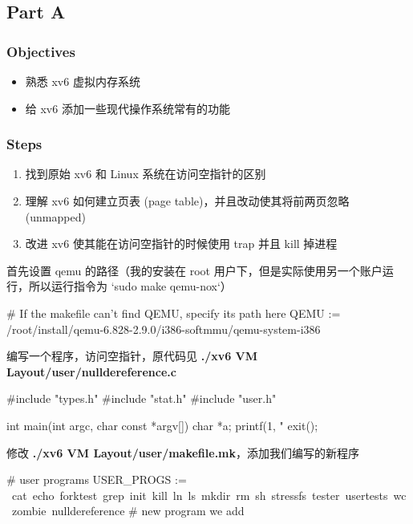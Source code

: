 \subsection{Part A}
\subsubsection{Objectives}

\begin{itemize}
    \item 熟悉 xv6 虚拟内存系统
    \item 给 xv6 添加一些现代操作系统常有的功能
\end{itemize}

\subsubsection{Steps}

\begin{enumerate}
    \item 找到原始 xv6 和 Linux 系统在访问空指针的区别
    \item 理解 xv6 如何建立页表 (page table)，并且改动使其将前两页忽略 (unmapped)
    \item 改进 xv6 使其能在访问空指针的时候使用 trap 并且 kill 掉进程
\end{enumerate}

首先设置 qemu 的路径（我的安装在 root 用户下，但是实际使用另一个账户运行，所以运行指令为 `sudo make qemu-nox`）

\begin{textcode}
    # If the makefile can't find QEMU, specify its path here
    QEMU := /root/install/qemu-6.828-2.9.0/i386-softmmu/qemu-system-i386
\end{textcode}

编写一个程序，访问空指针，原代码见 \textbf{./xv6 VM Layout/user/nulldereference.c}

\begin{ccode}
    #include "types.h"
    #include "stat.h"
    #include "user.h"
        
    int main(int argc, char const *argv[])
    {
        char *a;
        printf(1, "%
        exit();
    }
\end{ccode}

修改 \textbf{./xv6 VM Layout/user/makefile.mk}，添加我们编写的新程序

\begin{bashcode}
    # user programs
    USER_PROGS := \
    cat\
    echo\
    forktest\
    grep\
    init\
    kill\
    ln\
    ls\
    mkdir\
    rm\
    sh\
    stressfs\
    tester\
    usertests\
    wc\
    zombie\
    nulldereference # new program we add
\end{bashcode}

